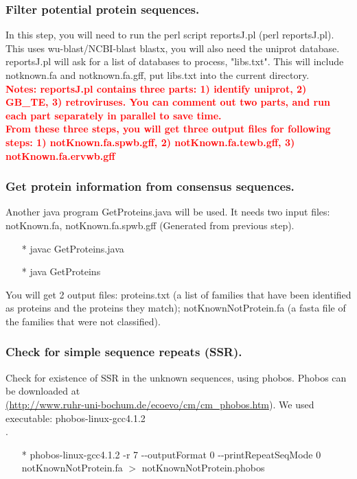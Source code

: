 \documentclass[12pt]{article}
\begin{document}
\subsubsection{Filter potential protein sequences.}
In this step, you will need to run the perl script reportsJ.pl (perl reportsJ.pl). This uses wu-blast/NCBI-blast blastx, you will also need the uniprot database. reportsJ.pl will ask for a list of databases to process, "libs.txt". This will include notknown.fa and notknown.fa.gff, put libs.txt into the current directory. \\

\noindent\textbf{\textcolor{red}{Notes: reportsJ.pl contains three parts: 1) identify uniprot, 2) GB\_TE, 3) retroviruses. You can comment out two parts, and run each part separately in parallel to save time. \\
		From these three steps, you will get three output files for following steps: 1) notKnown.fa.spwb.gff, 2) notKnown.fa.tewb.gff, 3) notKnown.fa.ervwb.gff}} 

\subsubsection{Get protein information from consensus sequences.}
Another java program GetProteins.java will be used. It needs two input files: notKnown.fa, notKnown.fa.spwb.gff (Generated from previous step).
\begin{enumerate}
	\item[*] javac GetProteins.java
	\item[*] java GetProteins
\end{enumerate}
You will get 2 output files: proteins.txt (a list of families that have been identified as proteins and the proteins they match);
notKnownNotProtein.fa (a fasta file of the families that were not classified).

\subsubsection{Check for simple sequence repeats (SSR).}
Check for existence of SSR in the unknown sequences, using phobos. Phobos can be downloaded at \\ \href{<url>}(\url{http://www.ruhr-uni-bochum.de/ecoevo/cm/cm_phobos.htm}). We used executable: phobos-linux-gcc4.1.2\\
.
\begin{enumerate}
	\item[*] phobos-linux-gcc4.1.2 -r 7 -{}-outputFormat 0 -{}-printRepeatSeqMode 0 notKnownNotProtein.fa $>$ notKnownNotProtein.phobos
\end{enumerate}
\end{document}
